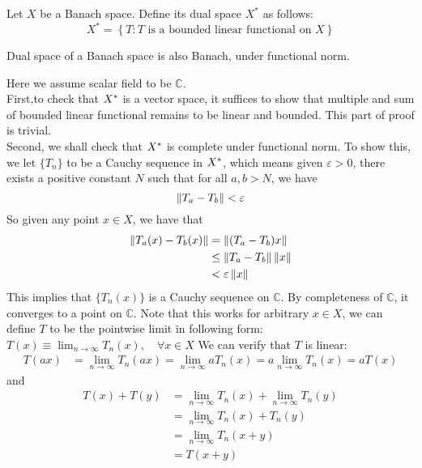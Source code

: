 \begin{definition}\rm\nextline
	Let $X$ be a Banach space. Define its dual space $X^*$ as follows:
	$$
		X^*=\left\{
		T: T\text{ is a bounded linear functional on } X
		\right\}
	$$
\end{definition}
\begin{proposition}\label{dual space Banach}\rm\nextline
	Dual space of a Banach space is also Banach, under functional norm.
	\begin{pf}{}{}

	Here we assume scalar field to be $\mathbb{C}$.\\
	First,to check that ${X}^*$ is a vector space, it suffices to show that multiple and sum of bounded linear functional remains to be linear and bounded. This part of proof is trivial.\\
	Second, we shall check that ${X}^*$ is complete under functional norm.
	To show this, we let $\{T_n\}$ to be a Cauchy sequence in ${X}^*$, which means given $\varepsilon>0$, there exists a positive constant $N$ such that for all $a,b>N$, we have
	$$
		\left\|{T_a-T_b}\right\|<\varepsilon
	$$
	So given any point $x\in X$, we have that
	\begin{equation}
		\begin{split}
			\left\|{T_a(x)-T_b(x)}\right\|&=\left\|{(T_a-T_b)x}\right\|\\
			&\leq \left\|{T_a-T_b}\right\|\left\|{x}\right\|\\
			&<\varepsilon\left\|{x}\right\|
		\end{split}
	\end{equation}
	This implies that $\{T_n(x)\}$ is a Cauchy sequence on $\mathbb{C}$. By completeness of $\mathbb{C}$, it converges to a point on $\mathbb{C}$. Note that this works for arbitrary $x\in X$, we can define $T$ to be the pointwise limit in following form:
	$
		T(x)\equiv\lim_{n\to\infty}{T_n(x)},\quad\forall x\in X
	$
	We can verify that $T$ is linear:
	\begin{equation}
		\begin{split}
			T(ax)&=\lim_{n\to\infty}{T_n(ax)}
			=\lim_{n\to\infty}{aT_n(x)}
			=a\lim_{n\to\infty}{T_n(x)}
			=aT(x)
		\end{split}
	\end{equation}
and
	\begin{equation}
		\begin{split}
			T(x)+T(y)&=\lim_{n\to\infty}{T_n(x)}+\lim_{n\to\infty}{T_n(y)} \\
			&=\lim_{n\to\infty}{T_n(x)+T_n(y)}\\
			&=\lim_{n\to\infty}{T_n(x+y)}\\
			&=T(x+y)
		\end{split}
	\end{equation}


\end{pf}
\end{proposition}
